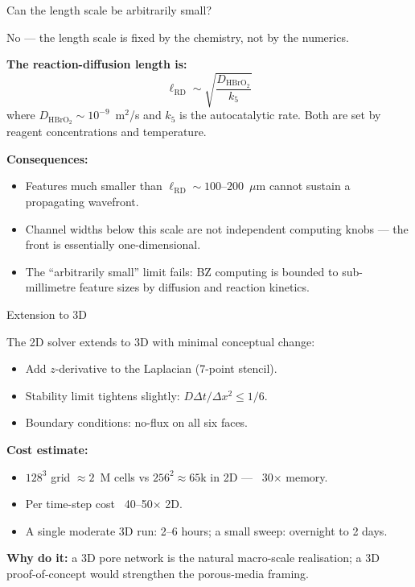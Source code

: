 \documentclass[aspectratio=169,11pt]{beamer}
\begin{document}
\begin{frame}{Can the length scale be arbitrarily small?}

No --- the length scale is fixed by the chemistry, not by the numerics.

\vspace{0.3cm}
\textbf{The reaction-diffusion length is:}
\[
\ell_{\mathrm{RD}} \sim \sqrt{\frac{D_{\mathrm{HBrO_2}}}{k_5}}
\]
where $D_{\mathrm{HBrO_2}} \sim 10^{-9}$~m$^2$/s and $k_5$ is the autocatalytic rate. Both are set by reagent concentrations and temperature.

\vspace{0.3cm}
\textbf{Consequences:}
\begin{itemize}
    \item Features much smaller than $\ell_{\mathrm{RD}} \sim 100$--$200$~$\mu$m cannot sustain a propagating wavefront.
    \item Channel widths below this scale are not independent computing knobs --- the front is essentially one-dimensional.
    \item The ``arbitrarily small'' limit fails: BZ computing is bounded to sub-millimetre feature sizes by diffusion and reaction kinetics.
\end{itemize}

\end{frame}

\begin{frame}{Extension to 3D}

The 2D solver extends to 3D with minimal conceptual change:

\vspace{0.3cm}
\begin{itemize}
    \item Add $z$-derivative to the Laplacian (7-point stencil).
    \item Stability limit tightens slightly: $D \Delta t / \Delta x^2 \leq 1/6$.
    \item Boundary conditions: no-flux on all six faces.
\end{itemize}

\vspace{0.3cm}
\textbf{Cost estimate:}
\begin{itemize}
    \item $128^3$ grid $\approx 2$~M cells vs $256^2 \approx 65$k in 2D --- ~30$\times$ memory.
    \item Per time-step cost ~40--50$\times$ 2D.
    \item A single moderate 3D run: 2--6 hours; a small sweep: overnight to 2 days.
\end{itemize}

\vspace{0.3cm}
\textbf{Why do it:} a 3D pore network is the natural macro-scale realisation; a 3D proof-of-concept would strengthen the porous-media framing.

\end{frame}
\end{document}
